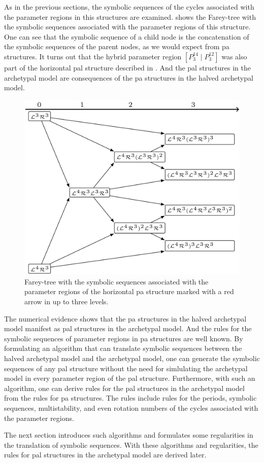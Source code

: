 As in the previous sections, the symbolic sequences of the cycles associated with the parameter regions in this structures are examined.
 shows the Farey-tree with the symbolic sequences associated with the parameter regions of this structure.
One can see that the symbolic sequence of a child node is the concatenation of the symbolic sequences of the parent nodes, as we would expect from \gls{pa} structures.
It turns out that the hybrid parameter region $\left[P^{14}_3 \mid P^{12}_3\right]$ was also part of the horizontal \gls{pal} structure described in .
And the \gls{pal} structures in the archetypal model are consequences of the \gls{pa} structures in the halved archetypal model.

\begin{figure}
	\centering
	\includegraphics[width=.7 \textwidth]{../Figures/7/7.20/adding.png}
	\caption[Farey-tree with the symbolic sequences of a horizontal  structure]{
		Farey-tree with the symbolic sequences associated with the parameter regions of the horizontal \gls{pa} structure marked with a red arrow in  up to three levels.
	}
	\label{fig:halved.hor.tree}
\end{figure}

The numerical evidence shows that the \gls{pa} structures in the halved archetypal model manifest as \gls{pal} structures in the archetypal model.
And the rules for the symbolic sequences of parameter regions in \gls{pa} structures are well known.
By formulating an algorithm that can translate symbolic sequences between the halved archetypal model and the archetypal model, one can generate the symbolic sequences of any \gls{pal} structure without the need for simlulating the archetypal model in every parameter region of the \gls{pal} structure.
Furthermore, with such an algorithm, one can derive rules for the \gls{pal} structures in the archetypal model from the rules for \gls{pa} structures.
The rules include rules for the periods, symbolic sequences, multistability, and even rotation numbers of the cycles associated with the parameter regions.

The next section introduces such algorithms and formulates some regularities in the translation of symbolic sequences.
With these algorithms and regularities, the rules for \gls{pal} structures in the archetypal model are derived later.
